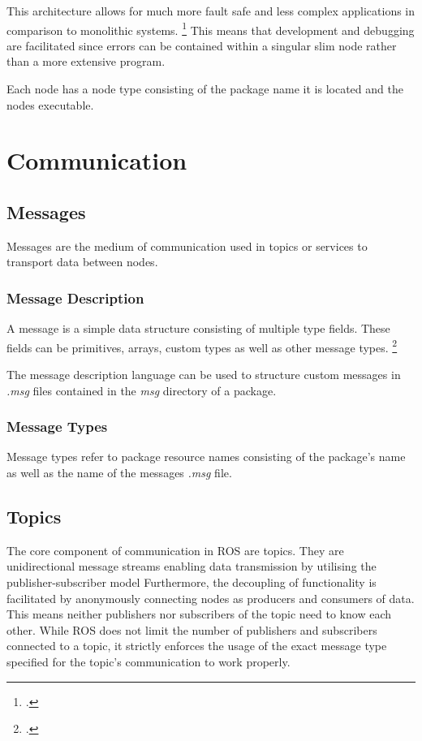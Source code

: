This architecture allows for much more fault safe and less complex applications in comparison to monolithic systems. \footcite[Page 94]{stephensBeginning2015}
This means that development and debugging are facilitated since errors can be contained within a singular slim node rather than a more extensive program. 

Each node has a node type consisting of the package name it is located and the nodes executable. 



\section{Communication}

\subsection{Messages}
Messages are the medium of communication used in topics or services to transport data between nodes. 

\subsubsection{Message Description}
A message is a simple data structure consisting of multiple type fields. These fields can be primitives, arrays, custom types as well as other message types. \footcite{openSourceRoboticsFoundationMessagesNodate}

The message description language can be used to structure custom messages in
\textit{.msg} files contained in the \textit{msg} directory of a package.

\subsubsection{Message Types}
Message types refer to package resource names consisting of the package's name as well as the name of the messages \textit{.msg} file.


\subsection{Topics}
The core component of communication in ROS are topics. They are unidirectional message streams enabling data transmission by utilising the publisher-subscriber model 
Furthermore, the decoupling of functionality is facilitated by anonymously connecting nodes as producers and consumers of data. This means neither publishers nor subscribers of the topic need to know each other. 
While ROS does not limit the number of publishers and subscribers connected to a topic, it strictly enforces the usage of the exact message type specified for the topic's communication to work properly.

